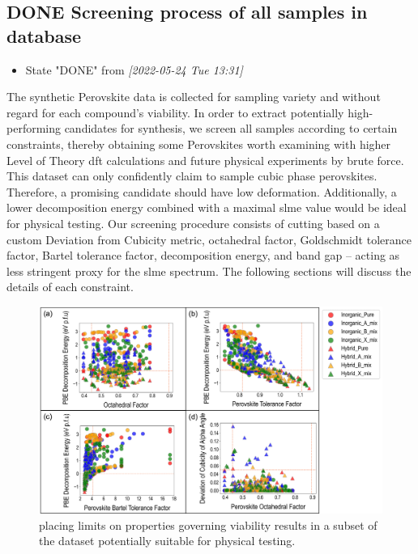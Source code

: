 \documentclass[twoside, twocolumn, 9pt, draft]{article}
\begin{document}
\subsection*{{\bfseries\sffamily DONE} Screening process of all samples in database}
\label{sec:org5953ef3}
\begin{itemize}
\item State "DONE"       from              \textit{[2022-05-24 Tue 13:31]}
\end{itemize}
The synthetic Perovskite data is collected for sampling variety and
without regard for each compound's viability. In order to extract
potentially high-performing candidates for synthesis, we screen all
samples according to certain constraints, thereby obtaining some
Perovskites worth examining with higher Level of Theory
\acrshort{dft} calculations and future physical experiments by
brute force. This dataset can only confidently claim to sample cubic
phase perovskites. Therefore, a promising candidate should have low
deformation. Additionally, a lower decomposition energy combined with
a maximal \gls{slme} value would be ideal for physical
testing. Our screening procedure consists of cutting based on a custom
Deviation from Cubicity metric, octahedral factor, Goldschmidt
tolerance factor, Bartel tolerance factor, decomposition energy, and
band gap -- acting as less stringent proxy for the \gls{slme}
spectrum. The following sections will discuss the details of each
constraint.

\begin{figure}
\centering
\includegraphics[width=.9\linewidth]{Figure6.png}
\caption{\label{fig:cuts} placing limits on properties governing viability results in a subset of the dataset potentially suitable for physical testing.}
\end{figure}
\end{document}

